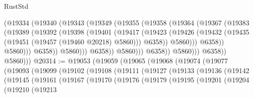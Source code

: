 \begin{lexlean}{RustStd}
\begin{coremodule}
                              (@19334
                                (@19340
                                  (@19343
                                    (@19349
                                      (@19355
                                        (@19358
                                          (@19364
                                            (@19367
                                              (@19383
                                                (@19389
                                                  (@19392
                                                    (@19398
                                                      (@19401
                                                        (@19417
                                                          (@19423
                                                            (@19426
                                                              (@19432
                                                                (@19435
                                                                  (@19451
                                                                    (@19457 (@19460 @20218) @5860)))
                                                                @6358))
                                                            @5860)))
                                                      @6358))
                                                  @5860)))
                                            @6358))
                                        @5860)))
                                  @6358))
                              @5860)))
                        @6358))
                    @5860)))
              @6358))
          @5860)))
@20314 := @19053
    (@19059
      (@19065
        (@19068
          (@19074
            (@19077
              (@19093
                (@19099
                  (@19102
                    (@19108
                      (@19111
                        (@19127
                          (@19133
                            (@19136
                              (@19142
                                (@19145
                                  (@19161
                                    (@19167
                                      (@19170
                                        (@19176
                                          (@19179
                                            (@19195
                                              (@19201
                                                (@19204
                                                  (@19210
                                                    (@19213

\end{coremodule}
\end{lexlean}
